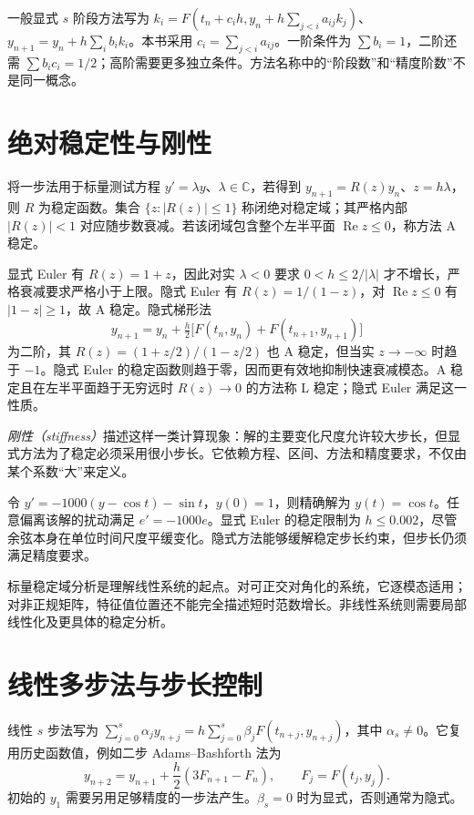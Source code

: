 \documentclass[UTF8,12pt,a4paper,fontset=fandol]{ctexbook}
\begin{document}
一般显式 $s$ 阶段方法写为 $k_i=F(t_n+c_ih,y_n+h\sum_{j<i}a_{ij}k_j)$、$y_{n+1}=y_n+h\sum_i b_ik_i$。本书采用 $c_i=\sum_{j<i}a_{ij}$。一阶条件为 $\sum b_i=1$，二阶还需 $\sum b_ic_i=1/2$；高阶需要更多独立条件。方法名称中的“阶段数”和“精度阶数”不是同一概念。

\section{绝对稳定性与刚性}
\label{sec:na-ode-stability}
\begin{definition}[稳定函数与绝对稳定域]
将一步法用于标量测试方程 $y'=\lambda y$、$\lambda\in\mathbb C$，若得到 $y_{n+1}=R(z)y_n$、$z=h\lambda$，则 $R$ 为稳定函数。集合 $\{z:|R(z)|\le1\}$ 称闭绝对稳定域；其严格内部 $|R(z)|<1$ 对应随步数衰减。若该闭域包含整个左半平面 $\operatorname{Re}z\le0$，称方法 A 稳定。
\end{definition}

显式 Euler 有 $R(z)=1+z$，因此对实 $\lambda<0$ 要求 $0<h\le2/|\lambda|$ 才不增长，严格衰减要求严格小于上限。隐式 Euler 有 $R(z)=1/(1-z)$，对 $\operatorname{Re}z\le0$ 有 $|1-z|\ge1$，故 A 稳定。隐式梯形法
\[
 y_{n+1}=y_n+\tfrac h2\bigl[F(t_n,y_n)+F(t_{n+1},y_{n+1})\bigr]
\]
为二阶，其 $R(z)=(1+z/2)/(1-z/2)$ 也 A 稳定，但当实 $z\to-\infty$ 时趋于 $-1$。隐式 Euler 的稳定函数则趋于零，因而更有效地抑制快速衰减模态。A 稳定且在左半平面趋于无穷远时 $R(z)\to0$ 的方法称 L 稳定；隐式 Euler 满足这一性质。

\emph{刚性（stiffness）}描述这样一类计算现象：解的主要变化尺度允许较大步长，但显式方法为了稳定必须采用很小步长。它依赖方程、区间、方法和精度要求，不仅由某个系数“大”来定义。

\begin{example}[平滑解与快速扰动模态]
令 $y'=-1000(y-\cos t)-\sin t$，$y(0)=1$，则精确解为 $y(t)=\cos t$。任意偏离该解的扰动满足 $e'=-1000e$。显式 Euler 的稳定限制为 $h\le0.002$，尽管余弦本身在单位时间尺度平缓变化。隐式方法能够缓解稳定步长约束，但步长仍须满足精度要求。
\end{example}

标量稳定域分析是理解线性系统的起点。对可正交对角化的系统，它逐模态适用；对非正规矩阵，特征值位置还不能完全描述短时范数增长。非线性系统则需要局部线性化及更具体的稳定分析。

\section{线性多步法与步长控制}
线性 $s$ 步法写为 $\sum_{j=0}^s\alpha_jy_{n+j}=h\sum_{j=0}^s\beta_jF(t_{n+j},y_{n+j})$，其中 $\alpha_s\ne0$。它复用历史函数值，例如二步 Adams--Bashforth 法为
\[
 y_{n+2}=y_{n+1}+\frac h2(3F_{n+1}-F_n),\qquad F_j=F(t_j,y_j).
\]
初始的 $y_1$ 需要另用足够精度的一步法产生。$\beta_s=0$ 时为显式，否则通常为隐式。
\end{document}
